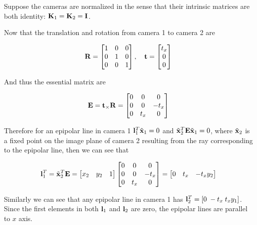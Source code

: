 \documentclass[11pt]{article}
\begin{document}
Suppose the cameras are normalized in the sense that their intrinsic matrices are both identity:  $\mathbf{K}_1=\mathbf{K}_2=\mathbf{I}$.

Now that the translation and rotation from camera 1 to camera 2 are

\begin{align}
    \mathbf{R} =
    \begin{bmatrix}
        1 & 0 & 0 \\
        0 & 1 & 0 \\
        0 & 0 & 1
    \end{bmatrix}, \quad
    \mathbf{t} =
    \begin{bmatrix}
        t_x \\ 0 \\ 0
    \end{bmatrix}
\end{align}

And thus the essential matrix are

\begin{align}
  \mathbf{E}=\mathbf{t}_\times \mathbf{R}=
  \begin{bmatrix}
    0 & 0 & 0 \\
    0 & 0 & -t_x \\
    0 & t_x & 0
  \end{bmatrix}
\end{align}

Therefore for an epipolar line in camera 1 $\mathbf{l}_1^T \tilde{\mathbf{x}}_1=0$ and $\tilde{\mathbf{x}}_2^T \mathbf{E} \tilde{\mathbf{x}}_1 =0$, where $\tilde{\mathbf{x}}_2$ is a fixed point on the image plane of camera 2 resulting from the ray corresponding to the epipolar line, then we can see that

\begin{align}
  \mathbf{l}_1^T = \tilde{\mathbf{x}}_2^T \mathbf{E} =
  \begin{bmatrix}
    x_2 & y_2 & 1
  \end{bmatrix}
  \begin{bmatrix}
    0 & 0 & 0 \\
    0 & 0 & -t_x \\
    0 & t_x & 0
  \end{bmatrix}
  =
  \begin{bmatrix}
    0 & t_x & -t_x y_2
  \end{bmatrix}
\end{align}

Similarly we can see that any epipolar line in camera 1 has $\mathbf{l}_2^T = [0 \; -t_x \; t_xy_1]$. Since the first elements in both $\mathbf{l}_1$ and $\mathbf{l}_2$ are zero, the epipolar lines are parallel to $x$ axis.
\end{document}
